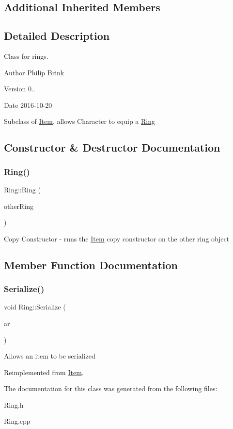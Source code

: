 \subsection*{Additional Inherited Members}


\subsection{Detailed Description}
Class for rings. 

\begin{DoxyAuthor}{Author}
Philip Brink 
\end{DoxyAuthor}
\begin{DoxyVersion}{Version}
0.. 
\end{DoxyVersion}
\begin{DoxyDate}{Date}
2016-\/10-\/20
\end{DoxyDate}
Subclass of \hyperlink{class_item}{Item}, allows Character to equip a \hyperlink{class_ring}{Ring} 

\subsection{Constructor \& Destructor Documentation}
\hypertarget{class_ring_ab65389fd4a0837c0f82a1b9207ba8330}{}\label{class_ring_ab65389fd4a0837c0f82a1b9207ba8330} 
\subsubsection{\texorpdfstring{Ring()}{Ring()}}
{\footnotesize\ttfamily Ring\+::\+Ring (\begin{DoxyParamCaption}\item[{const \hyperlink{class_ring}{Ring} $\ast$}]{other\+Ring }\end{DoxyParamCaption})}

Copy Constructor -\/ runs the \hyperlink{class_item}{Item} copy constructor on the other ring object 

\subsection{Member Function Documentation}
\hypertarget{class_ring_a123e40607e2aa46b27da2228af73eb4a}{}\label{class_ring_a123e40607e2aa46b27da2228af73eb4a} 
\subsubsection{\texorpdfstring{Serialize()}{Serialize()}}
{\footnotesize\ttfamily void Ring\+::\+Serialize (\begin{DoxyParamCaption}\item[{C\+Archive \&}]{ar }\end{DoxyParamCaption})\hspace{0.3cm}{\ttfamily [virtual]}}

Allows an item to be serialized 

Reimplemented from \hyperlink{class_item_ad1eae21e57fc3ce3252080a4efbfb8e8}{Item}.



The documentation for this class was generated from the following files\+:\begin{DoxyCompactItemize}
\item 
Ring.\+h\item 
Ring.\+cpp\end{DoxyCompactItemize}
